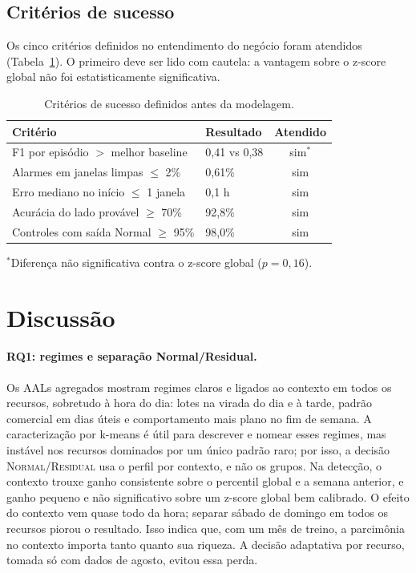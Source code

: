 \documentclass[sigconf,nonacm]{acmart}
\newcommand{\Normal}{\textsc{Normal}\xspace}
\newcommand{\Residual}{\textsc{Residual}\xspace}
\begin{document}
\subsection{Critérios de sucesso}
Os cinco critérios definidos no entendimento do negócio foram atendidos (Tabela~\ref{tab:criterios}). O primeiro deve ser lido com cautela: a vantagem sobre o z-score global não foi estatisticamente significativa.

\begin{table}[t]
  \caption{Critérios de sucesso definidos antes da modelagem.}
  \label{tab:criterios}
  \small
  \begin{tabular}{p{}p{}c}
    \toprule
    Critério & Resultado & Atendido \\
    \midrule
    F1 por episódio $>$ melhor baseline & 0,41 vs 0,38 & sim$^\ast$ \\
    Alarmes em janelas limpas $\leq$ 2\% & 0,61\% & sim \\
    Erro mediano no início $\leq$ 1 janela & 0,1 h & sim \\
    Acurácia do lado provável $\geq$ 70\% & 92,8\% & sim \\
    Controles com saída Normal $\geq$ 95\% & 98,0\% & sim \\
    \bottomrule
  \end{tabular}
  \par\smallskip\footnotesize $^\ast$Diferença não significativa contra o z-score global ($p=0{,}16$).
\end{table}

\section{Discussão}\label{sec:discussao}

\paragraph{RQ1: regimes e separação Normal/Residual.} Os AALs agregados mostram regimes claros e ligados ao contexto em todos os recursos, sobretudo à hora do dia: lotes na virada do dia e à tarde, padrão comercial em dias úteis e comportamento mais plano no fim de semana. A caracterização por k-means é útil para descrever e nomear esses regimes, mas instável nos recursos dominados por um único padrão raro; por isso, a decisão \Normal/\Residual usa o perfil por contexto, e não os grupos. Na detecção, o contexto trouxe ganho consistente sobre o percentil global e a semana anterior, e ganho pequeno e não significativo sobre um z-score global bem calibrado. O efeito do contexto vem quase todo da hora; separar sábado de domingo em todos os recursos piorou o resultado. Isso indica que, com um mês de treino, a parcimônia no contexto importa tanto quanto sua riqueza. A decisão adaptativa por recurso, tomada só com dados de agosto, evitou essa perda.
\end{document}
